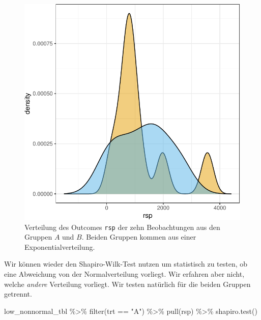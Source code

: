 \documentclass[
  letterpaper,
]{scrbook}
\newenvironment{Shaded}{\begin{snugshade}}{\end{snugshade}}
\newcommand{\FunctionTok}[1]{\textcolor[rgb]{0.28,0.35,0.67}{#1}}
\newcommand{\NormalTok}[1]{\textcolor[rgb]{0.00,0.23,0.31}{#1}}
\newcommand{\SpecialCharTok}[1]{\textcolor[rgb]{0.37,0.37,0.37}{#1}}
\newcommand{\StringTok}[1]{\textcolor[rgb]{0.13,0.47,0.30}{#1}}
\begin{document}
\begin{figure}
\begin{minipage}[t]{0.50\linewidth}
{{\includegraphics{./stat-tests-pretest_files/figure-pdf/fig-normal-2-2.pdf}

}

}

\end{minipage}%

\caption{\label{fig-normal-2}Verteilung des Outcomes \texttt{rsp} der
zehn Beobachtungen aus den Gruppen \(A\) und \(B\). Beiden Gruppen
kommen aus einer Exponentialverteilung.}

\end{figure}

Wir können wieder den Shapiro-Wilk-Test nutzen um statistisch zu testen,
ob eine Abweichung von der Normalverteilung vorliegt. Wir erfahren aber
nicht, welche \emph{andere} Verteilung vorliegt. Wir testen natürlich
für die beiden Gruppen getrennt.

\begin{Shaded}
\begin{Highlighting}[]
\NormalTok{low\_nonnormal\_tbl }\SpecialCharTok{\%\textgreater{}\%} 
  \FunctionTok{filter}\NormalTok{(trt }\SpecialCharTok{==} \StringTok{"A"}\NormalTok{) }\SpecialCharTok{\%\textgreater{}\%} 
  \FunctionTok{pull}\NormalTok{(rsp) }\SpecialCharTok{\%\textgreater{}\%} 
  \FunctionTok{shapiro.test}\NormalTok{()}
\end{Highlighting}
\end{Shaded}
\end{document}
